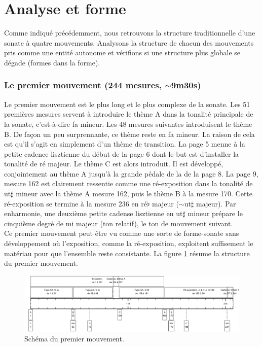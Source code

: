 \section{Analyse et forme}

Comme indiqué précédemment, nous retrouvons la structure traditionnelle d'une sonate à quatre mouvements. Analysons la structure de chacun des mouvements pris comme une entité autonome et vérifions si une structure plus globale se dégade (formes dans la forme).

\subsubsection*{Le premier mouvement (244 mesures, $\sim$9m30s)}

Le premier mouvement est le plus long et le plus complexe de la sonate. Les 51 premières mesures servent à introduire le thème A dans la tonalité principale de la sonate, c'est-à-dire fa mineur. Les 48 mesures suivantes introduisent le thème B. De façon un peu surprennante, ce thème reste en fa mineur. La raison de cela est qu'il s'agit en simplement d'un thème de transition. La page 5 menne à la petite cadence lisztienne du début de la page 6 dont le but est d'installer la tonalité de ré majeur. Le thème C est alors introduit. Il est développé, conjointement au thème A jusqu'à la grande pédale de la de la page 8. La page 9, mesure 162 est clairement ressentie comme une ré-exposition dans la tonalité de ut$\sharp$ mineur avec la thème A mesure 162, puis le thème B à la mesure 170. Cette ré-exposition se termine à la mesure 236 en ré$\flat$ majeur ($\sim$ut$\sharp$ majeur). Par enharmonie, une deuxième petite cadense lisztienne en ut$\sharp$ mineur prépare le cinquième degré de mi majeur (ton relatif), le ton de mouvement suivant.\\

Ce premier mouvement peut être vu comme une sorte de forme-sonate sans développement où l'exposition, comme la ré-exposition, exploitent suffisement le matériau pour que l'ensemble reste consistante. La figure \ref{schema-1} résume la structure du premier mouvement.

\begin{figure}[!ht]
  \begin{bigcenter}
    \includegraphics[width=17.5cm, keepaspectratio]{frise-mvt1.png}
  \end{bigcenter}
  \caption{\label{schema-1}Schéma du premier mouvement.}
\end{figure}

